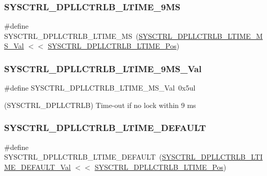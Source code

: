 \subsubsection{\texorpdfstring{SYSCTRL\_DPLLCTRLB\_LTIME\_9MS}{SYSCTRL\_DPLLCTRLB\_LTIME\_9MS}}
{\footnotesize\ttfamily \#define S\+Y\+S\+C\+T\+R\+L\+\_\+\+D\+P\+L\+L\+C\+T\+R\+L\+B\+\_\+\+L\+T\+I\+M\+E\+\_\+MS~(\mbox{\hyperlink{group___s_a_m_d21___s_y_s_c_t_r_l_gaba799a6835775b1c2a20cd1e4087d582}{S\+Y\+S\+C\+T\+R\+L\+\_\+\+D\+P\+L\+L\+C\+T\+R\+L\+B\+\_\+\+L\+T\+I\+M\+E\+\_\+M\+S\+\_\+\+Val}} $<$$<$ \mbox{\hyperlink{group___s_a_m_d21___s_y_s_c_t_r_l_ga906665610facc5bdb428c5b237c15df5}{S\+Y\+S\+C\+T\+R\+L\+\_\+\+D\+P\+L\+L\+C\+T\+R\+L\+B\+\_\+\+L\+T\+I\+M\+E\+\_\+\+Pos}})}

\mbox{\label{group___s_a_m_d21___s_y_s_c_t_r_l_gaba799a6835775b1c2a20cd1e4087d582}} 
\subsubsection{\texorpdfstring{SYSCTRL\_DPLLCTRLB\_LTIME\_9MS\_Val}{SYSCTRL\_DPLLCTRLB\_LTIME\_9MS\_Val}}
{\footnotesize\ttfamily \#define S\+Y\+S\+C\+T\+R\+L\+\_\+\+D\+P\+L\+L\+C\+T\+R\+L\+B\+\_\+\+L\+T\+I\+M\+E\+\_\+M\+S\+\_\+\+Val~0x5ul}



(S\+Y\+S\+C\+T\+R\+L\+\_\+\+D\+P\+L\+L\+C\+T\+R\+LB) Time-\/out if no lock within 9 ms 

\mbox{\label{group___s_a_m_d21___s_y_s_c_t_r_l_ga42d7bfdebd85c4bb1f249274d16477fa}} 
\subsubsection{\texorpdfstring{SYSCTRL\_DPLLCTRLB\_LTIME\_DEFAULT}{SYSCTRL\_DPLLCTRLB\_LTIME\_DEFAULT}}
{\footnotesize\ttfamily \#define S\+Y\+S\+C\+T\+R\+L\+\_\+\+D\+P\+L\+L\+C\+T\+R\+L\+B\+\_\+\+L\+T\+I\+M\+E\+\_\+\+D\+E\+F\+A\+U\+LT~(\mbox{\hyperlink{group___s_a_m_d21___s_y_s_c_t_r_l_gae5f144f6fd5480d44176047d6bc6b32b}{S\+Y\+S\+C\+T\+R\+L\+\_\+\+D\+P\+L\+L\+C\+T\+R\+L\+B\+\_\+\+L\+T\+I\+M\+E\+\_\+\+D\+E\+F\+A\+U\+L\+T\+\_\+\+Val}} $<$$<$ \mbox{\hyperlink{group___s_a_m_d21___s_y_s_c_t_r_l_ga906665610facc5bdb428c5b237c15df5}{S\+Y\+S\+C\+T\+R\+L\+\_\+\+D\+P\+L\+L\+C\+T\+R\+L\+B\+\_\+\+L\+T\+I\+M\+E\+\_\+\+Pos}})}

